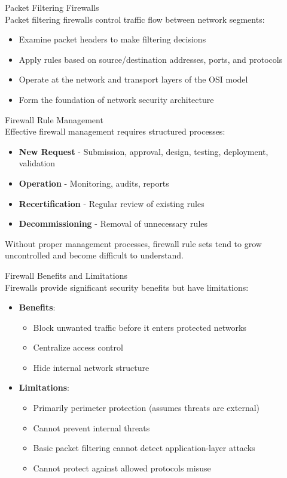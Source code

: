 \begin{definition}{Packet Filtering Firewalls}\\
Packet filtering firewalls control traffic flow between network segments:
\begin{itemize}
    \item Examine packet headers to make filtering decisions
    \item Apply rules based on source/destination addresses, ports, and protocols
    \item Operate at the network and transport layers of the OSI model
    \item Form the foundation of network security architecture
\end{itemize}
\end{definition}

\begin{concept}{Firewall Rule Management}\\
Effective firewall management requires structured processes:
\begin{itemize}
    \item \textbf{New Request} - Submission, approval, design, testing, deployment, validation
    \item \textbf{Operation} - Monitoring, audits, reports
    \item \textbf{Recertification} - Regular review of existing rules
    \item \textbf{Decommissioning} - Removal of unnecessary rules
\end{itemize}
Without proper management processes, firewall rule sets tend to grow uncontrolled and become difficult to understand.
\end{concept}

\begin{theorem}{Firewall Benefits and Limitations}\\
Firewalls provide significant security benefits but have limitations:
\begin{itemize}
    \item \textbf{Benefits}:
    \begin{itemize}
        \item Block unwanted traffic before it enters protected networks
        \item Centralize access control
        \item Hide internal network structure
    \end{itemize}
    \item \textbf{Limitations}:
    \begin{itemize}
        \item Primarily perimeter protection (assumes threats are external)
        \item Cannot prevent internal threats
        \item Basic packet filtering cannot detect application-layer attacks
        \item Cannot protect against allowed protocols misuse
    \end{itemize}
\end{itemize}
\end{theorem}

